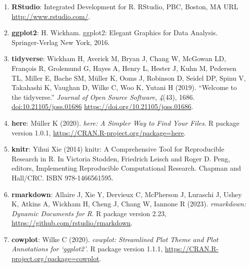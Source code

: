 \documentclass[11pt,a4paper,]{article}
\providecommand{\tightlist}{%
  \setlength{\itemsep}{0pt}\setlength{\parskip}{0pt}}
\begin{document}
\begin{enumerate}
\def\labelenumi{\arabic{enumi}.}
\tightlist
\item
  \textbf{RStudio}: Integrated Development for R. RStudio, PBC, Boston, MA URL \url{http://www.rstudio.com/}.
\item
  \textbf{ggplot2}: H. Wickham. ggplot2: Elegant Graphics for Data Analysis. Springer-Verlag New York, 2016.
\item
  \textbf{tidyverse}: Wickham H, Averick M, Bryan J, Chang W, McGowan LD, François R, Grolemund G, Hayes A, Henry L, Hester J, Kuhn M, Pedersen TL, Miller E, Bache SM, Müller K,
  Ooms J, Robinson D, Seidel DP, Spinu V, Takahashi K, Vaughan D, Wilke C, Woo K, Yutani H (2019). ``Welcome to the tidyverse.'' \emph{Journal of Open Source Software},
  \emph{4}(43), 1686. \url{doi:10.21105/joss.01686} \url{https://doi.org/10.21105/joss.01686}.
\item
  \textbf{here}: Müller K (2020). \emph{here: A Simpler Way to Find Your Files}. R package version 1.0.1, \url{https://CRAN.R-project.org/package=here}.
\item
  \textbf{knitr}: Yihui Xie (2014) knitr: A Comprehensive Tool for Reproducible Research in R. In Victoria Stodden, Friedrich Leisch and Roger D. Peng, editors, Implementing
  Reproducible Computational Research. Chapman and Hall/CRC. ISBN 978-1466561595.
\item
  \textbf{rmarkdown}: Allaire J, Xie Y, Dervieux C, McPherson J, Luraschi J, Ushey K, Atkins A, Wickham H, Cheng J, Chang W, Iannone R (2023). \emph{rmarkdown: Dynamic Documents for R}.
  R package version 2.23, \url{https://github.com/rstudio/rmarkdown}.
\item
  \textbf{cowplot}: Wilke C (2020). \emph{cowplot: Streamlined Plot Theme and Plot Annotations for `ggplot2'}. R package version 1.1.1, \url{https://CRAN.R-project.org/package=cowplot}.
\end{enumerate}

\printbibliography
\end{document}
